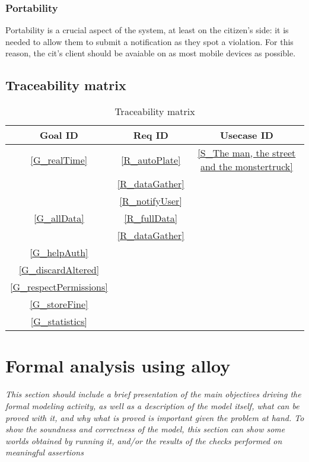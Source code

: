 \documentclass{article}
\begin{document}
		\subsubsection{Portability}
			Portability is a crucial aspect of the system, at least on the citizen's side: it is needed to allow them to submit a notification as they spot a violation. For this reason, the cit's client should be avaiable on as most mobile devices as possible.
			
	\subsection{Traceability matrix}
		\begin{table}[H]
			\begin{center}
				\caption{Traceability matrix}
				\label{Trace matrix}
				\begin{tabular}{S|S|S}
					\textbf{Goal ID} & \textbf{Req ID} & \textbf{Usecase ID}\\
					\hline
					\ref{G_realTime} & \ref{R_autoPlate} & \ref{S_The man, the street and the monstertruck}\\
					&\ref{R_dataGather}&\\
					&\ref{R_notifyUser}&\\
					\hline
					\ref{G_allData} & \ref{R_fullData} & \\
						& \ref{R_dataGather} & \\
					\hline
					\ref{G_helpAuth}&&\\
					\hline
					\ref{G_discardAltered}&&\\
					\hline
					\ref{G_respectPermissions}&&\\
					\hline
					\ref{G_storeFine}&&\\
					\hline
					\ref{G_statistics}&&\\
				\end{tabular}
			\end{center}
		\end{table}
		
\section{Formal analysis using alloy} \textit{This section should include a brief presentation of the main objectives driving the formal modeling activity, as well as a description of the model itself, what can be proved with it, and why what is proved is important given the problem at hand. To show the soundness and correctness of the model, this section can show some worlds obtained by running it, and/or the results of the checks performed on meaningful assertions}
\end{document}
